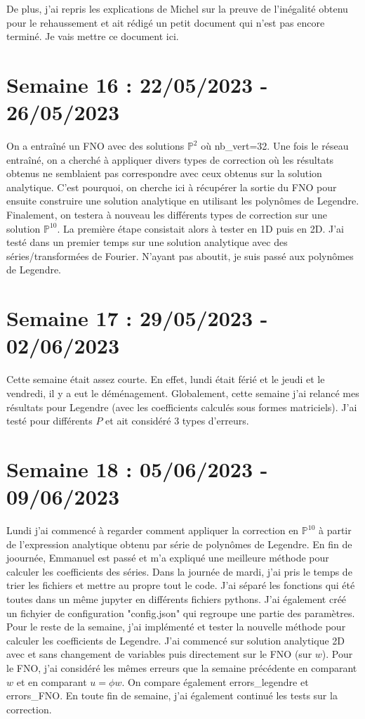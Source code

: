 \documentclass[french]{article}
\begin{document}
	De plus, j'ai repris les explications de Michel sur la preuve de l'inégalité obtenu pour le rehaussement et ait rédigé un petit document qui n'est pas encore terminé. Je vais mettre ce document ici.  
\section{Semaine 16 : 22/05/2023 - 26/05/2023}
	On a entraîné un FNO avec des solutions $\mathbb{P}^2$ où nb\_vert=32. Une fois le réseau entraîné, on a cherché à appliquer divers types de correction où les résultats obtenus ne semblaient pas correspondre avec ceux obtenus sur la solution analytique. C'est pourquoi, on cherche ici à récupérer la sortie du FNO pour ensuite construire une solution analytique en utilisant les polynômes de Legendre. Finalement, on testera à nouveau les différents types de correction sur une solution $\mathbb{P}^{10}$. La première étape consistait alors à tester en 1D puis en 2D. J'ai testé dans un premier temps sur une solution analytique avec des séries/transformées de Fourier. N'ayant pas aboutit, je suis passé aux polynômes de Legendre. 
\section{Semaine 17 : 29/05/2023 - 02/06/2023}
	Cette semaine était assez courte. En effet, lundi était férié et le jeudi et le vendredi, il y a eut le déménagement.
	Globalement, cette semaine j'ai relancé mes résultats pour Legendre (avec les coefficients calculés sous formes matriciels). J'ai testé pour différents $P$ et ait considéré 3 types d'erreurs.
\section{Semaine 18 : 05/06/2023 - 09/06/2023}
	Lundi j'ai commencé à regarder comment appliquer la correction en $\mathbb{P}^{10}$ à partir de l'expression analytique obtenu par série de polynômes de Legendre. En fin de joournée, Emmanuel est passé et m'a expliqué une meilleure méthode pour calculer les coefficients des séries. 
	Dans la journée de mardi, j'ai pris le temps de trier les fichiers et mettre au propre tout le code. J'ai séparé les fonctions qui été toutes dans un même jupyter en différents fichiers pythons. J'ai également créé un fichyier de configuration "config.json" qui regroupe une partie des paramètres.
	Pour le reste de la semaine, j'ai implémenté et tester la nouvelle méthode pour calculer les coefficients de Legendre. J'ai commencé sur solution analytique 2D avec et sans changement de variables puis directement sur le FNO (sur $w$). Pour le FNO, j'ai considéré les mêmes erreurs que la semaine précédente en comparant $w$ et en comparant $u=\phi w$. On compare également errors\_legendre et errors\_FNO.
	En toute fin de semaine, j'ai également continué les tests sur la correction.
\end{document}
